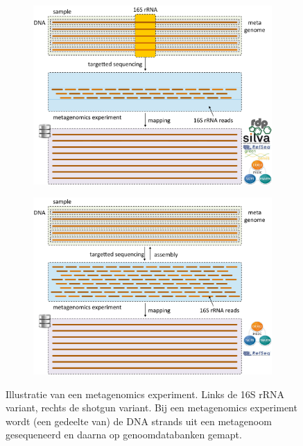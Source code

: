 \begin{figure}
	\centering
	\begin{subfigure}{0.49\textwidth}
		\centering
		\includegraphics[width=\textwidth]{includes/targetted_metagenomics}
		\caption{}
	\end{subfigure}
	\begin{subfigure}{0.49\textwidth}
		\centering
		\includegraphics[width=\textwidth]{includes/shotgun_metagenomics}
		\caption{}
	\end{subfigure}
	
	\caption{Illustratie van een metagenomics experiment. Links de 16S rRNA 
	variant, rechts de shotgun variant. Bij een metagenomics experiment wordt 
	(een gedeelte van) de DNA strands uit een metagenoom gesequeneerd en daarna 
	op genoomdatabanken gemapt.}
	\label{fig:metagenomics}
\end{figure}

